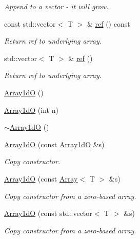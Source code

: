 \begin{DoxyCompactItemize}
\begin{DoxyCompactList}\small\item\em Append to a vector -\/ it will grow. \end{DoxyCompactList}\item 
const std\+::vector$<$ T $>$ \& \mbox{\hyperlink{classADAT_1_1Array1dO_a3b74880db3b0d48e29fb28f80a283352}{ref}} () const
\begin{DoxyCompactList}\small\item\em Return ref to underlying array. \end{DoxyCompactList}\item 
std\+::vector$<$ T $>$ \& \mbox{\hyperlink{classADAT_1_1Array1dO_ac3ff9b35bef8e7fa276136673b907749}{ref}} ()
\begin{DoxyCompactList}\small\item\em Return ref to underlying array. \end{DoxyCompactList}\item 
\mbox{\hyperlink{classADAT_1_1Array1dO_af55d30db029bb654a123544dfc155e6a}{Array1dO}} ()
\item 
\mbox{\hyperlink{classADAT_1_1Array1dO_abd486987192b85b2cd27fd28660168bf}{Array1dO}} (int n)
\item 
\mbox{\hyperlink{classADAT_1_1Array1dO_a4abf4e2555ad2189b5000e323f0f99e8}{$\sim$\+Array1dO}} ()
\item 
\mbox{\hyperlink{classADAT_1_1Array1dO_abf14ebcf56d52421ff42141883440283}{Array1dO}} (const \mbox{\hyperlink{classADAT_1_1Array1dO}{Array1dO}} \&s)
\begin{DoxyCompactList}\small\item\em Copy constructor. \end{DoxyCompactList}\item 
\mbox{\hyperlink{classADAT_1_1Array1dO_adcc074ae1935a9371a950d1a99bfa3ec}{Array1dO}} (const \mbox{\hyperlink{classXMLArray_1_1Array}{Array}}$<$ T $>$ \&s)
\begin{DoxyCompactList}\small\item\em Copy constructor from a zero-\/based array. \end{DoxyCompactList}\item 
\mbox{\hyperlink{classADAT_1_1Array1dO_aad6c2df87d1dc941fd561fd74d181ddc}{Array1dO}} (const std\+::vector$<$ T $>$ \&s)
\begin{DoxyCompactList}\small\item\em Copy constructor from a zero-\/based array. \end{DoxyCompactList}\item 

\end{DoxyCompactItemize}
